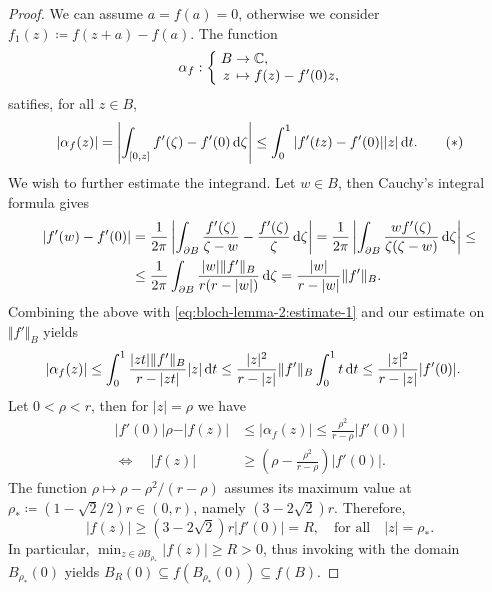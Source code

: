 \begin{proof}
    We can assume $a = f(a) = 0$, otherwise we consider $f_1(z) \coloneqq f(z + a) - f(a)$. The function
    $$ \mapping{\alpha_f}{B & \to & \C,}{z & \mapsto & f(z) - f'(0) z,} $$
    satifies, for all $z \in B$,
    \begin{equation} \label{eq:bloch-lemma-2:estimate-1}
        \vert \alpha_f(z) \vert = \left\vert \int_{[0, z]} f'(\zeta) - f'(0) \mathop{}\!\mathrm{d} \zeta \right\vert \leq \int_0^1 \vert f'(t z) - f'(0) \vert \vert z \vert \mathop{}\!\mathrm{d} t. \tag{\textasteriskcentered}
    \end{equation}
    We wish to further estimate the integrand. Let $w \in B$, then Cauchy's integral formula gives
    \begin{align*}
        \vert f'(w) - f'(0) \vert &= \frac{1}{2\pi} \left\vert \int_{\partial B} \frac{f'(\zeta)}{\zeta - w} - \frac{f'(\zeta)}{\zeta} \mathop{}\!\mathrm{d} \zeta \right\vert = \frac{1}{2\pi} \left\vert \int_{\partial B} \frac{w f'(\zeta)}{\zeta (\zeta - w)} \mathop{}\!\mathrm{d} \zeta \right\vert \leq \\
        &\leq \frac{1}{2\pi} \int_{\partial B} \frac{\vert w \vert \Vert f' \Vert_B}{r(r - \vert w \vert)} \mathop{}\!\mathrm{d} \zeta = \frac{\vert w \vert}{r - \vert w \vert} \Vert f' \Vert_B.
    \end{align*}
    Combining the above with \eqref{eq:bloch-lemma-2:estimate-1} and our estimate on $\Vert f' \Vert_B$ yields
    \begin{align*}
        \vert \alpha_f(z) \vert &\leq \int_0^1 \frac{\vert z t \vert \Vert f' \Vert_B}{r - \vert z t \vert} \vert z \vert \mathop{}\!\mathrm{d} t \leq \frac{\vert z \vert^2}{r - \vert z \vert} \Vert f' \Vert_B \int_0^1 t \mathop{}\!\mathrm{d} t \leq \frac{\vert z \vert^2}{r - \vert z \vert} \vert f'(0) \vert.
    \end{align*}
    Let $0 < \rho < r$, then for $\vert z \vert = \rho$ we have
    \begin{align*}
        \vert f'(0) \vert \rho - \vert f(z) \vert &\leq \vert \alpha_f(z) \vert \leq \frac{\rho^2}{r - \rho} \vert f'(0) \vert \\
        \Longleftrightarrow \quad \vert f(z) \vert &\geq \left( \rho - \frac{\rho^2}{r - \rho} \right) \vert f'(0) \vert.
    \end{align*}
    The function $\rho \mapsto \rho - \rho^2 / (r - \rho)$ assumes its maximum value at $\rho_* \coloneqq (1 - \sqrt{2} / 2)r \in (0, r)$, namely $(3 - 2 \sqrt{2}) r$. Therefore,
    \begin{equation*}
        \vert f(z) \vert \geq (3 - 2 \sqrt{2}) r \vert f'(0) \vert = R, \quad \textrm{for all} \quad \vert z \vert = \rho_*.
    \end{equation*}
    In particular, $\min_{z \in \partial B_{\rho_*}} \vert f(z) \vert \geq R > 0$, thus invoking  with the domain $B_{\rho_*}(0)$ yields $B_{R}(0) \subseteq f(B_{\rho_*}(0)) \subseteq f(B)$.
\end{proof}

